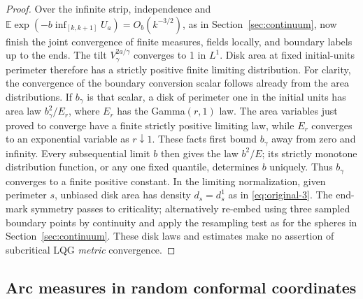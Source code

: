 \begin{proof}
Over the infinite strip, independence and \(\mathbb E\exp(-b\inf_{[k,k+1]}U_a)=O_b(k^{-3/2})\), as in Section~\ref{sec:continuum}, now finish the joint convergence of finite measures, fields locally, and boundary labels up to the ends.
The tilt \(V_\gamma^{2a/\gamma}\) converges to 1 in \(L^1\).
Disk area at fixed initial-units perimeter therefore has a strictly positive finite limiting distribution.
For clarity, the convergence of the boundary conversion scalar follows
already from the area distributions.  If $b_\gamma$ is that scalar, a disk
of perimeter one in the initial units has area law
$b_\gamma^2/E_r$, where $E_r$ has the Gamma$(r,1)$ law.  The area variables
just proved to converge have a finite strictly positive limiting law, while
$E_r$ converges to an exponential variable as $r\downarrow1$.  These facts
first bound $b_\gamma$ away from zero and infinity.  Every subsequential
limit $b$ then gives the law $b^2/E$; its strictly monotone distribution
function, or any one fixed quantile, determines $b$ uniquely.  Thus
$b_\gamma$ converges to a finite positive constant.
In the limiting normalization, given perimeter \(s\), unbiased disk area has density \(d_s=d_s^1\) as in \eqref{eq:original-3}.
The end-mark symmetry passes to criticality; alternatively re-embed using three sampled boundary points by continuity and apply the resampling test as for the spheres in Section~\ref{sec:continuum}.
These disk laws and estimates make no assertion of subcritical LQG \emph{metric} convergence.

\end{proof}

\subsection{Arc measures in random conformal coordinates}\label{proxy:arc-measures}

